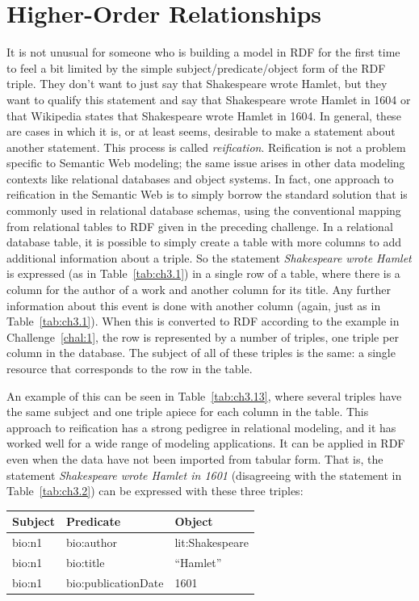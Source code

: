 \section{Higher-Order Relationships}
\label{ch5.reification}

It is not unusual for someone who is building a model in RDF for the
first time to feel a bit limited by the simple subject/predicate/object
form of the RDF triple. They don't want to just say that Shakespeare
wrote Hamlet, but they want to qualify this statement and say that
Shakespeare wrote Hamlet in 1604 or that Wikipedia states that
Shakespeare wrote Hamlet in 1604. In general, these are cases in which
it is, or at least seems, desirable to make a statement about another
statement. This process is called \emph{reification}. Reification is not a
problem specific to Semantic Web modeling; the same issue arises in
other data modeling contexts like relational databases and object
systems. In fact, one approach to reification in the Semantic Web is to
simply borrow the standard solution that is commonly used in relational
database schemas, using the conventional mapping from relational tables
to RDF given in the preceding challenge. In a relational database table,
it is possible to simply create a table with more columns to add
additional information about a triple. So the statement
\emph{Shakespeare wrote Hamlet} is expressed (as in Table~\ref{tab:ch3.1}) in a
single row of a table, where there is a column for the author of a work
and another column for its title. Any further information about this
event is done with another column (again, just as in Table~\ref{tab:ch3.1}). When
this is converted to RDF according to the example in Challenge~\ref{chal:1}, the
row is represented by a number of triples, one triple per column in the
database. The subject of all of these triples is the same: a single
resource that corresponds to the row in the table.

An example of this can be seen in Table~\ref{tab:ch3.13}, where several triples have
the same subject and one triple apiece for each column in the table.
This approach to reification has a strong pedigree in relational
modeling, and it has worked well for a wide range of modeling
applications. It can be applied in RDF even when the data have not been
imported from tabular form. That is, the statement \emph{Shakespeare
wrote Hamlet in 1601} (disagreeing with the statement in Table~\ref{tab:ch3.2}) can
be expressed with these three triples:

\begin{tabular}{|l l l |}
\hline
Subject&Predicate&Object\\
\hline
bio:n1&bio:author&lit:Shakespeare \\
bio:n1&bio:title&``Hamlet''\\
bio:n1&bio:publicationDate&1601\\
\hline
\end{tabular}

